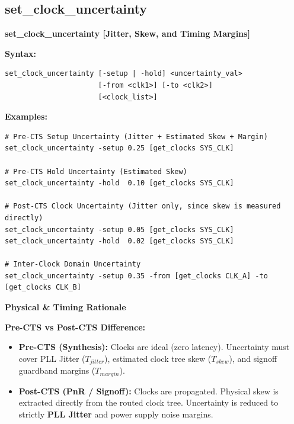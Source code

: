 \documentclass[11pt,a4paper]{article}
\newenvironment{cmdbox}[2]{%
  \begin{mdframed}[style=cmdstyle]%
  {\bfseries\sffamily\color{primary}#1 \hfill \footnotesize\color{mutedgray}[#2]}\par\vspace{3pt}%
}{%
  \end{mdframed}%
}
\newenvironment{physbox}{%
  \begin{mdframed}[style=physstyle]%
  {\bfseries\sffamily\color{darktext}\small Physical \& Timing Rationale}\par\vspace{2pt}\small%
}{%
  \end{mdframed}%
}
\begin{document}
\subsection{set\_clock\_uncertainty}
\begin{cmdbox}{set\_clock\_uncertainty}{Jitter, Skew, and Timing Margins}
\textbf{Syntax:}
\begin{lstlisting}[style=sdcstyle]
set_clock_uncertainty [-setup | -hold] <uncertainty_val> 
                      [-from <clk1>] [-to <clk2>] 
                      [<clock_list>]
\end{lstlisting}
\textbf{Examples:}
\begin{lstlisting}[style=sdcstyle]
# Pre-CTS Setup Uncertainty (Jitter + Estimated Skew + Margin)
set_clock_uncertainty -setup 0.25 [get_clocks SYS_CLK]

# Pre-CTS Hold Uncertainty (Estimated Skew)
set_clock_uncertainty -hold  0.10 [get_clocks SYS_CLK]

# Post-CTS Clock Uncertainty (Jitter only, since skew is measured directly)
set_clock_uncertainty -setup 0.05 [get_clocks SYS_CLK]
set_clock_uncertainty -hold  0.02 [get_clocks SYS_CLK]

# Inter-Clock Domain Uncertainty
set_clock_uncertainty -setup 0.35 -from [get_clocks CLK_A] -to [get_clocks CLK_B]
\end{lstlisting}
\end{cmdbox}

\begin{physbox}
\textbf{Pre-CTS vs Post-CTS Difference:}
\begin{itemize}[leftmargin=1.5em]
  \item \textbf{Pre-CTS (Synthesis):} Clocks are ideal (zero latency). Uncertainty must cover PLL Jitter ($T_{jitter}$), estimated clock tree skew ($T_{skew}$), and signoff guardband margins ($T_{margin}$).
  \item \textbf{Post-CTS (PnR / Signoff):} Clocks are propagated. Physical skew is extracted directly from the routed clock tree. Uncertainty is reduced to strictly \textbf{PLL Jitter} and power supply noise margins.
\end{itemize}
\end{physbox}
\end{document}
